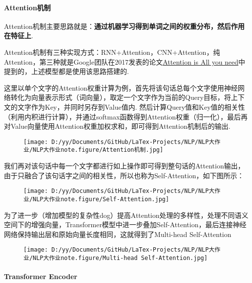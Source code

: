 \documentclass[
]{article}
\begin{document}
\hypertarget{attentionux673aux5236}{%
\paragraph{Attention机制}\label{attentionux673aux5236}}

Attention机制主要思路就是：\textbf{通过机器学习得到单词之间的权重分布，然后作用在特征上}.

Attention机制有三种实现方式：RNN+Attention，CNN+Attention，纯Attention，第三种就是Google团队在2017发表的论文\href{https://arxiv.org/pdf/1706.03762.pdf}{Attention
is All you need}中提到的，上述模型都是使用该思路搭建的.

这里以单个文字的Attention权重计算为例，首先将该句话总每个文字使用神经网络转化为向量表示形式（词向量），取定一个文字作为当前的Query目标，将上下文的文字作为Key，并同时另存到Value值内.
然后计算Query值和Key值的相关性（利用内积进行计算），并通过softmax函数得到Attention权重（归一化），最后再对Value向量使用Attention权重加权求和，即可得到Attention机制后的输出.

\begin{figure}
\centering
\texttt{[image: D:/yy/Documents/GitHub/LaTex-Projects/NLP/NLP大作业/NLP大作业note.figure/Attention机制.jpg]}
\caption{}
\end{figure}

我们再对该句话中每一个文字都进行如上操作即可得到整句话的Attention输出，由于只融合了该句话字之间的相关性，所以也称为Self-Attention，如下图所示：

\begin{figure}
\centering
\texttt{[image: D:/yy/Documents/GitHub/LaTex-Projects/NLP/NLP大作业/NLP大作业note.figure/Self-Attention.jpg]}
\caption{}
\end{figure}

为了进一步（增加模型的复杂性dog）提高Attention处理的多样性，处理不同语义空间下的增强向量，Transformer模型中进一步叠加Self-Attention，最后连接神经网络保持输出层和原始向量长度相同，这就得到了Multi-head
Self-Attention

\begin{figure}
\centering
\texttt{[image: D:/yy/Documents/GitHub/LaTex-Projects/NLP/NLP大作业/NLP大作业note.figure/Multi-head Self-Attention.jpg]}
\caption{}
\end{figure}

\hypertarget{transformer-encoder}{%
\paragraph{Transformer Encoder}\label{transformer-encoder}}
\end{document}
